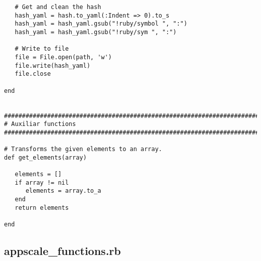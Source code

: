 \begin{lstlisting}
   # Get and clean the hash
   hash_yaml = hash.to_yaml(:Indent => 0).to_s
   hash_yaml = hash_yaml.gsub("!ruby/symbol ", ":")
   hash_yaml = hash_yaml.gsub("!ruby/sym ", ":")
   
   # Write to file
   file = File.open(path, 'w')
   file.write(hash_yaml)
   file.close

end


################################################################################
# Auxiliar functions
################################################################################

# Transforms the given elements to an array.
def get_elements(array)

   elements = []
   if array != nil
      elements = array.to_a
   end
   return elements

end
\end{lstlisting}


\subsection{appscale\_functions.rb}


